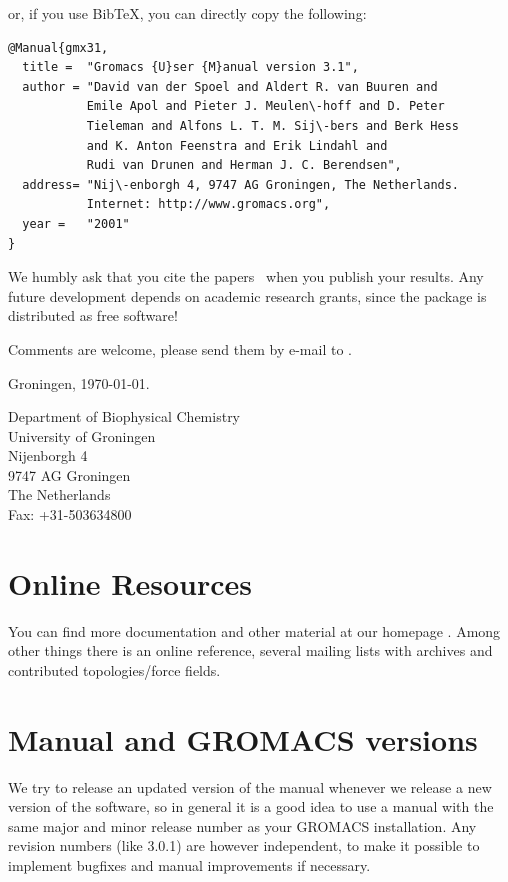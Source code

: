 \documentclass[11pt,a4paper,twoside]{gmxmanual}
\begin{document}
or, if you use BibTeX, you can directly copy the following:
\begin{verbatim}
@Manual{gmx31,
  title =  "Gromacs {U}ser {M}anual version 3.1",
  author = "David van der Spoel and Aldert R. van Buuren and 
           Emile Apol and Pieter J. Meulen\-hoff and D. Peter 
           Tieleman and Alfons L. T. M. Sij\-bers and Berk Hess 
           and K. Anton Feenstra and Erik Lindahl and 
           Rudi van Drunen and Herman J. C. Berendsen",
  address= "Nij\-enborgh 4, 9747 AG Groningen, The Netherlands.
           Internet: http://www.gromacs.org",
  year =   "2001"
}
\end{verbatim}

We humbly ask that you cite the {\gromacs} 
papers~\cite{Berendsen95a,Lindahl2001a} when you publish your
results. Any future development depends on academic
research grants, since the package is distributed as free software!


Comments are welcome, please send them by e-mail to {\email}.
\medskip

Groningen, \today.
\medskip

Department of Biophysical Chemistry \\
University of Groningen \\ 
Nijenborgh 4                            \\
9747 AG Groningen                       \\
The Netherlands                         \\
Fax: +31-503634800

\newpage
\section*{Online Resources}
You can find more documentation and other material 
at our homepage \wwwpage. Among other things there is
 an online reference,
several {\gromacs} mailing lists with archives and contributed 
topologies/force fields. 


\section*{Manual and GROMACS versions}
We try to release an updated version of the manual whenever
we release a new version of the software, so in general 
it is a good idea to use a manual with the same major and
minor release number as your GROMACS installation. 
Any revision numbers (like 3.0.1) are however independent, 
to make it possible to implement bugfixes and manual
improvements if necessary. 
\end{document}
